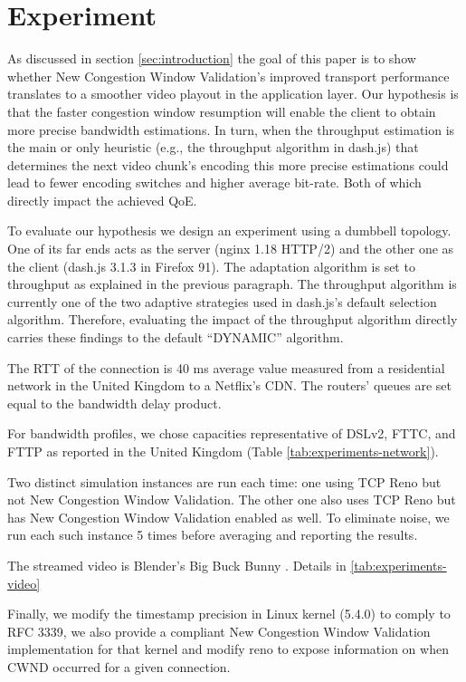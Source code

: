 \documentclass[10pt,sigconf]{acmart}
\begin{document}
\hspace{3in}

\section{Experiment}

As discussed in section \ref{sec:introduction} the goal of this paper is to show whether New Congestion Window Validation's improved transport performance translates to a smoother video playout in the application layer. Our hypothesis is that the faster congestion window resumption will enable the client to obtain more precise bandwidth estimations. In turn, when the throughput estimation is the main or only heuristic (e.g., the throughput algorithm in dash.js) that determines the next video chunk's encoding this more precise estimations could lead to fewer encoding switches and higher average bit-rate. Both of which directly impact the achieved QoE.

To evaluate our hypothesis we design an experiment using a dumbbell topology. One of its far ends acts as the server (nginx 1.18 HTTP/2) and the other one as the client (dash.js 3.1.3 in Firefox 91). The adaptation algorithm is set to throughput as explained in the previous paragraph. The throughput algorithm is currently one of the two adaptive strategies used in dash.js's default selection algorithm. Therefore, evaluating the impact of the throughput algorithm directly carries these findings to the default ``DYNAMIC'' algorithm. 

The RTT of the connection is 40 ms average value measured from a residential network in the United Kingdom to a Netflix's CDN. The routers' queues are set equal to the bandwidth delay product.

For bandwidth profiles, we chose capacities representative of DSLv2, FTTC, and FTTP as reported in the United Kingdom \cite{online-ofcom-report} (Table \ref{tab:experiments-network}).

Two distinct simulation instances are run each time: one using TCP Reno but not New Congestion Window Validation. The other one also uses TCP Reno but has New Congestion Window Validation enabled as well. To eliminate noise, we run each such instance 5 times before averaging and reporting the results.

The streamed video is Blender's Big Buck Bunny \cite{online-bbb}. Details in \ref{tab:experiments-video}

Finally, we modify the timestamp precision in Linux kernel (5.4.0) to comply to RFC 3339, we also provide a \cite{rfc7661-2015-fairhurst-new-cwnd-validation} compliant New Congestion Window Validation implementation for that kernel and modify reno to expose information on when CWND occurred for a given connection.
\end{document}
